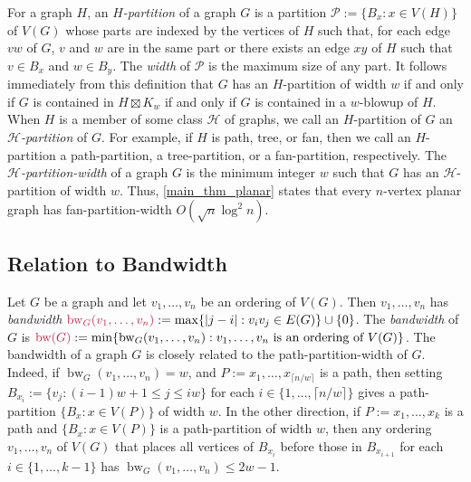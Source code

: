 \documentclass{patmorin}
\makeatletter
\renewcommand{\le}{\leqslant}
\newcommand{\david}[1]{{\color{orange} David: #1}}
\newcommand{\defin}[1]{\emph{\textcolor{brightmaroon}{#1}}}
\def\mathcolor#1#{\@mathcolor{#1}}
\def\@mathcolor#1#2#3{%
  \protect\leavevmode
  \begingroup
    \color#1{#2}#3%
  \endgroup
}
\newcommand{\mathdefin}[1]{\mathcolor{brightmaroon}{#1}}
\DeclareMathOperator{\bw}{bw}
\makeatother
\begin{document}
For a graph $H$, an \defin{$H$-partition} of a graph $G$ is a partition $\mathcal{P}:=\{B_x: x\in V(H)\}$ of $V(G)$ whose parts are indexed by the vertices of $H$ such that, for each edge $vw$ of $G$, $v$ and $w$ are in the same part or there exists an edge $xy$ of $H$ such that $v\in B_x$ and $w\in B_y$.  The \defin{width} of $\mathcal{P}$ is the maximum size of any part.  It follows immediately from this definition that $G$ has an $H$-partition of width $w$ if and only if $G$ is contained in $H\boxtimes K_w$ if and only if $G$ is contained in a $w$-blowup of $H$. When $H$ is a member of some class $\mathcal{H}$ of graphs, we call an $H$-partition of $G$ an \defin{$\mathcal{H}$-partition} of $G$.  For example, if $H$ is path, tree, or fan, then we call an $H$-partition a path-partition, a tree-partition, or a fan-partition, respectively.  The \defin{$\mathcal{H}$-partition-width}  of a graph $G$ is the minimum integer $w$ such that $G$ has an $\mathcal{H}$-partition of width $w$. Thus, \cref{main_thm_planar} states that every $n$-vertex planar graph has fan-partition-width $O(\sqrt{n}\log^2 n)$.


\subsection{Relation to Bandwidth}
\label{Bandwidth}

Let $G$ be a graph and let $v_1,\ldots,v_n$ be an ordering of $V(G)$.
Then $v_1,\ldots,v_n$ has \defin{bandwidth} $\mathdefin{\bw_G(v_1,\ldots,v_n)}:=\max\{|j-i|: v_iv_j\in E(G)\}\cup\{0\}$.
The \defin{bandwidth} of $G$ is $\mathdefin{\bw(G)}:=\min\{\bw_G(v_1,\ldots,v_n):\text{$v_1,\ldots,v_n$ is an ordering of $V(G)$}\}$. The bandwidth of a graph $G$ is closely related to the path-partition-width of $G$.  Indeed, if $\bw_G(v_1,\ldots,v_n)=w$, and $P:=x_1,\ldots,x_{\lceil n/w\rceil}$ is a path, then setting $B_{x_i}:=\{v_j: (i-1)w+1 \le j \le iw\}$ for each $i\in\{1,\ldots,\lceil n/w\rceil\}$ gives a path-partition $\{B_{x}:x\in V(P)\}$ of width $w$.  In the other direction, if $P:=x_1,\ldots,x_k$ is a path and  $\{B_x:x\in V(P)\}$ is a path-partition of width $w$, then any ordering $v_1,\ldots,v_n$ of $V(G)$ that places all vertices of $B_{x_i}$ before those in $B_{x_{i+1}}$ for each $i\in\{1,\ldots,k-1\}$ has $\bw_G(v_1,\ldots,v_n)\le 2w-1$.
\end{document}
